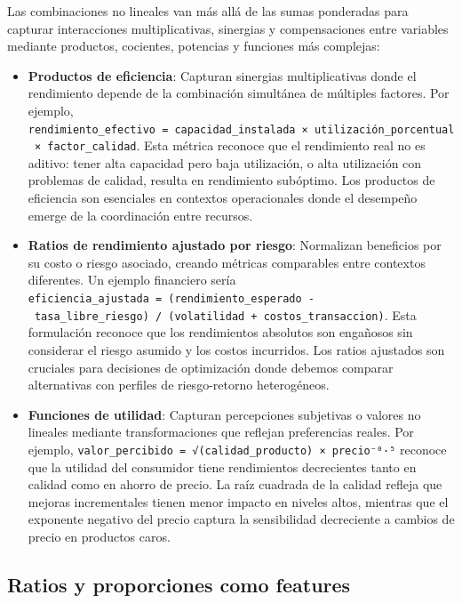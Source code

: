 \documentclass[
  letterpaper,
  DIV=11,
  numbers=noendperiod]{scrreprt}
\begin{document}
Las combinaciones no lineales van más allá de las sumas ponderadas para
capturar interacciones multiplicativas, sinergias y compensaciones entre
variables mediante productos, cocientes, potencias y funciones más
complejas:

\begin{itemize}
\item
  \textbf{Productos de eficiencia}: Capturan sinergias multiplicativas
  donde el rendimiento depende de la combinación simultánea de múltiples
  factores. Por ejemplo,
  \texttt{rendimiento\_efectivo\ =\ capacidad\_instalada\ ×\ utilización\_porcentual\ ×\ factor\_calidad}.
  Esta métrica reconoce que el rendimiento real no es aditivo: tener
  alta capacidad pero baja utilización, o alta utilización con problemas
  de calidad, resulta en rendimiento subóptimo. Los productos de
  eficiencia son esenciales en contextos operacionales donde el
  desempeño emerge de la coordinación entre recursos.
\item
  \textbf{Ratios de rendimiento ajustado por riesgo}: Normalizan
  beneficios por su costo o riesgo asociado, creando métricas
  comparables entre contextos diferentes. Un ejemplo financiero sería
  \texttt{eficiencia\_ajustada\ =\ (rendimiento\_esperado\ -\ tasa\_libre\_riesgo)\ /\ (volatilidad\ +\ costos\_transaccion)}.
  Esta formulación reconoce que los rendimientos absolutos son engañosos
  sin considerar el riesgo asumido y los costos incurridos. Los ratios
  ajustados son cruciales para decisiones de optimización donde debemos
  comparar alternativas con perfiles de riesgo-retorno heterogéneos.
\item
  \textbf{Funciones de utilidad}: Capturan percepciones subjetivas o
  valores no lineales mediante transformaciones que reflejan
  preferencias reales. Por ejemplo,
  \texttt{valor\_percibido\ =\ √(calidad\_producto)\ ×\ precio⁻⁰·⁵}
  reconoce que la utilidad del consumidor tiene rendimientos
  decrecientes tanto en calidad como en ahorro de precio. La raíz
  cuadrada de la calidad refleja que mejoras incrementales tienen menor
  impacto en niveles altos, mientras que el exponente negativo del
  precio captura la sensibilidad decreciente a cambios de precio en
  productos caros.
\end{itemize}

\subsection{Ratios y proporciones como
features}\label{ratios-y-proporciones-como-features}
\end{document}
